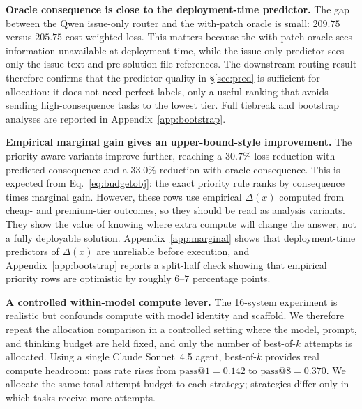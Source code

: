 \documentclass{article}
\begin{document}
\textbf{Oracle consequence is close to the deployment-time predictor.}
The gap between the Qwen issue-only router and the with-patch oracle is small: $209.75$ versus $205.75$ cost-weighted loss. This matters because the with-patch oracle sees information unavailable at deployment time, while the issue-only predictor sees only the issue text and pre-solution file references. The downstream routing result therefore confirms that the predictor quality in \S\ref{sec:pred} is sufficient for allocation: it does not need perfect labels, only a useful ranking that avoids sending high-consequence tasks to the lowest tier. Full tiebreak and bootstrap analyses are reported in Appendix~\ref{app:bootstrap}.

\textbf{Empirical marginal gain gives an upper-bound-style improvement.}
The priority-aware variants improve further, reaching a $30.7\%$ loss reduction with predicted consequence and a $33.0\%$ reduction with oracle consequence. This is expected from Eq.~\ref{eq:budgetobj}: the exact priority rule ranks by consequence times marginal gain. However, these rows use empirical $\Delta(x)$ computed from cheap- and premium-tier outcomes, so they should be read as analysis variants. They show the value of knowing where extra compute will change the answer, not a fully deployable solution. Appendix~\ref{app:marginal} shows that deployment-time predictors of $\Delta(x)$ are unreliable before execution, and Appendix~\ref{app:bootstrap} reports a split-half check showing that empirical priority rows are optimistic by roughly $6$--$7$ percentage points.

\textbf{A controlled within-model compute lever.}
The 16-system experiment is realistic but confounds compute with model identity and scaffold. We therefore repeat the allocation comparison in a controlled setting where the model, prompt, and thinking budget are held fixed, and only the number of best-of-$k$ attempts is allocated. Using a single Claude Sonnet~4.5 agent, best-of-$k$ provides real compute headroom: pass rate rises from $\mathrm{pass@}1=0.142$ to $\mathrm{pass@}8=0.370$. We allocate the same total attempt budget to each strategy; strategies differ only in which tasks receive more attempts.
\end{document}
